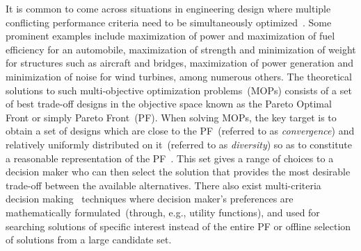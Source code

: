 It is common to come across situations in engineering design where multiple conflicting performance criteria need to be simultaneously optimized~\cite{deb2001multi,Asafuddoula2015,KHTjmd2016,KHTjmd2017}. Some prominent examples include maximization of power and maximization of fuel efficiency for an automobile, maximization of strength and minimization of weight for structures such as aircraft and bridges, maximization of power generation and minimization of noise for wind turbines, among numerous others. The theoretical solutions to such multi-objective optimization problems~(MOPs) consists of a set of best trade-off designs in the objective space known as the Pareto Optimal Front or simply Pareto Front~(PF). When solving MOPs, the key target is to obtain a set of designs which are close to the PF~(referred to as \textit{convergence}) and relatively uniformly distributed on it~(referred to as \textit{diversity}) so as to constitute a reasonable representation of the PF~\cite{deb2001multi}. {\color{blue}This set gives a range of choices to a decision maker who can then select the solution that provides the most desirable trade-off between the available alternatives. There also exist multi-criteria decision making~\cite{gal2013multicriteria} techniques where decision maker's preferences are mathematically formulated~(through, e.g., utility functions), and used for searching solutions of specific interest instead of the entire PF or offline selection of solutions from a large candidate set.}  

